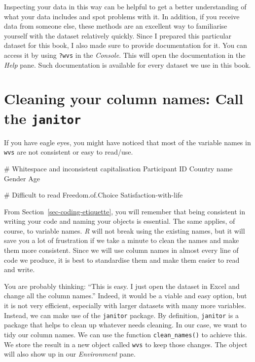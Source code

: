 \documentclass[
  letterpaper,
  DIV=11,
  numbers=noendperiod]{scrreprt}
\newenvironment{Shaded}{\begin{snugshade}}{\end{snugshade}}
\newcommand{\CommentTok}[1]{\textcolor[rgb]{0.37,0.37,0.37}{#1}}
\newcommand{\NormalTok}[1]{\textcolor[rgb]{0.00,0.23,0.31}{#1}}
\newcommand{\SpecialCharTok}[1]{\textcolor[rgb]{0.37,0.37,0.37}{#1}}
\begin{document}
Inspecting your data in this way can be helpful to get a better
understanding of what your data includes and spot problems with it. In
addition, if you receive data from someone else, these methods are an
excellent way to familiarise yourself with the dataset relatively
quickly. Since I prepared this particular dataset for this book, I also
made sure to provide documentation for it. You can access it by using
\texttt{?wvs} in the \emph{Console}. This will open the documentation in
the \emph{Help} pane. Such documentation is available for every dataset
we use in this book.

\section{\texorpdfstring{Cleaning your column names: Call the
\texttt{janitor}}{Cleaning your column names: Call the janitor}}\label{sec-colnames-cleaning}

If you have eagle eyes, you might have noticed that most of the variable
names in \texttt{wvs} are not consistent or easy to read/use.

\label{messy_column_names}%
\begin{Shaded}
\begin{Highlighting}[]
\CommentTok{\# Whitespace and inconsistent capitalisation}
\NormalTok{Participant ID        }
\NormalTok{Country name          }
\NormalTok{Gender                }
\NormalTok{Age                   }

\CommentTok{\# Difficult to read}
\NormalTok{Freedom.of.Choice     }
\NormalTok{Satisfaction}\SpecialCharTok{{-}}\NormalTok{with}\SpecialCharTok{{-}}\NormalTok{life}
\end{Highlighting}
\end{Shaded}

From Section~\ref{sec-coding-etiquette}, you will remember that being
consistent in writing your code and naming your objects is essential.
The same applies, of course, to variable names. \emph{R} will not break
using the existing names, but it will save you a lot of frustration if
we take a minute to clean the names and make them more consistent. Since
we will use column names in almost every line of code we produce, it is
best to standardise them and make them easier to read and write.

You are probably thinking: ``This is easy. I just open the dataset in
Excel and change all the column names.'' Indeed, it would be a viable
and easy option, but it is not very efficient, especially with larger
datasets with many more variables. Instead, we can make use of the
\texttt{janitor} package. By definition, \texttt{janitor} is a package
that helps to clean up whatever needs cleaning. In our case, we want to
tidy our column names. We can use the function \texttt{clean\_names()}
to achieve this. We store the result in a new object called \texttt{wvs}
to keep those changes. The object will also show up in our
\emph{Environment} pane.
\end{document}
